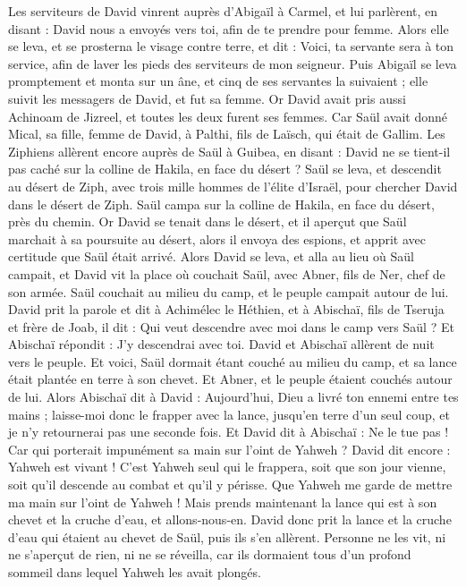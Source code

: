 \begin{multicols}{2}
Les serviteurs de David vinrent auprès d'Abigaïl à Carmel, et lui parlèrent, en disant : David nous a envoyés vers toi, afin de te prendre pour femme.
Alors elle se leva, et se prosterna le visage contre terre, et dit : Voici, ta servante sera à ton service, afin de laver les pieds des serviteurs de mon seigneur.
Puis Abigaïl se leva promptement et monta sur un âne, et cinq de ses servantes la suivaient ; elle suivit les messagers de David, et fut sa femme.
Or David avait pris aussi Achinoam de Jizreel, et toutes les deux furent ses femmes.
Car Saül avait donné Mical, sa fille, femme de David, à Palthi, fils de Laïsch, qui était de Gallim.
\VerseOne{}Les Ziphiens allèrent encore auprès de Saül à Guibea, en disant : David ne se tient-il pas caché sur la colline de Hakila, en face du désert ?
Saül se leva, et descendit au désert de Ziph, avec trois mille hommes de l'élite d'Israël, pour chercher David dans le désert de Ziph.
Saül campa sur la colline de Hakila, en face du désert, près du chemin. Or David se tenait dans le désert, et il aperçut que Saül marchait à sa poursuite au désert,
alors il envoya des espions, et apprit avec certitude que Saül était arrivé.
Alors David se leva, et alla au lieu où Saül campait, et David vit la place où couchait Saül, avec Abner, fils de Ner, chef de son armée. Saül couchait au milieu du camp, et le peuple campait autour de lui.
David prit la parole et dit à Achimélec le Héthien, et à Abischaï, fils de Tseruja et frère de Joab, il dit : Qui veut descendre avec moi dans le camp vers Saül ? Et Abischaï répondit : J'y descendrai avec toi.
David et Abischaï allèrent de nuit vers le peuple. Et voici, Saül dormait étant couché au milieu du camp, et sa lance était plantée en terre à son chevet. Et Abner, et le peuple étaient couchés autour de lui.
Alors Abischaï dit à David : Aujourd'hui, Dieu a livré ton ennemi entre tes mains ; laisse-moi donc le frapper avec la lance, jusqu'en terre d'un seul coup, et je n'y retournerai pas une seconde fois.
Et David dit à Abischaï : Ne le tue pas ! Car qui porterait impunément sa main sur l'oint de Yahweh ?
David dit encore : Yahweh est vivant ! C'est Yahweh seul qui le frappera, soit que son jour vienne, soit qu'il descende au combat et qu'il y périsse.
Que Yahweh me garde de mettre ma main sur l'oint de Yahweh ! Mais prends maintenant la lance qui est à son chevet et la cruche d'eau, et allons-nous-en.
David donc prit la lance et la cruche d'eau qui étaient au chevet de Saül, puis ils s'en allèrent. Personne ne les vit, ni ne s'aperçut de rien, ni ne se réveilla, car ils dormaient tous d'un profond sommeil dans lequel Yahweh les avait plongés.

\end{multicols}
